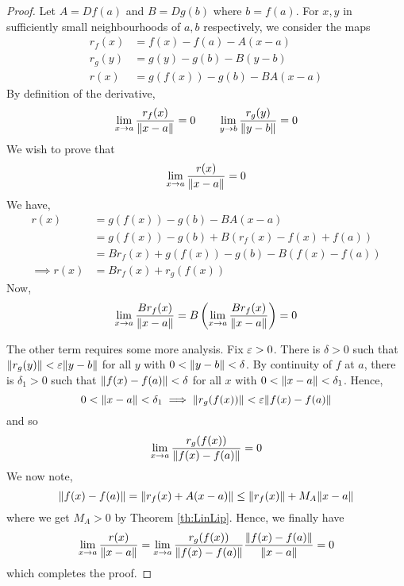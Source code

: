 \documentclass[../Analysis-3.tex]{subfiles}
\begin{document}
\begin{proof}
  Let $ A = Df(a) $ and $ B = Dg(b) $ where $ b = f(a) $. For $ x,y $ in sufficiently small neighbourhoods of $ a,b $ respectively, we consider the maps
  \begin{align*}
    r_f(x) & = f(x) - f(a) - A(x-a)      \\
    r_g(y) & = g(y) - g(b) - B(y-b)      \\
    r(x)   & = g(f(x)) - g(b) - BA(x-a)
  \end{align*}
  By definition of the derivative,
  \[ \lim_{x \to a}\frac{r_f(x)}{\norm{x-a}}=0 \qquad \lim_{y \to b}\frac{r_g(y)}{\norm{y-b}}=0\]
  We wish to prove that
  \[ \lim_{x \to a}\frac{r(x)}{\norm{x-a}}=0 \]
  We have,
  \begin{align*}
    r(x)          & = g(f(x)) - g(b) - BA(x-a)                \\
                  & = g(f(x)) - g(b) + B(r_f(x) - f(x)+f(a))  \\
                  & = Br_f(x) + g(f(x)) - g(b) - B(f(x)-f(a)) \\
    \implies r(x) & = Br_f(x) + r_g(f(x))
  \end{align*}
  Now,
  \[ \lim_{x \to a}\frac{Br_f(x)}{\norm{x-a}} = B \left(\lim_{x \to a}\frac{Br_f(x)}{\norm{x-a}}\right) = 0 \]\ssk
  
  The other term requires some more analysis. Fix $ \varepsilon > 0 $. There is $ \delta > 0 $ such that $ \norm{r_g(y)} < \varepsilon \norm{y-b} $ for all $ y $ with $ 0 < \norm{y-b} < \delta $. By continuity of $ f $ at $ a $, there is $ \delta_1 > 0 $ such that $ \norm{f(x) - f(a)} < \delta $ for all $ x $ with $ 0 < \norm{x-a} < \delta_1 $. Hence,
  \[ 0 < \norm{x-a} < \delta_1 \implies \norm{r_g(f(x))} < \varepsilon\norm{f(x)-f(a)} \]
  and so
  \[ \lim_{x \to a}\frac{r_g(f(x))}{\norm{f(x)-f(a)}} = 0 \]
  We now note,
  \[ \norm{f(x)-f(a)} = \norm{r_f(x)+A(x-a)} \leq \norm{r_f(x)} + M_A\norm{x-a} \]
  where we get $ M_A > 0 $ by Theorem \ref{th:LinLip}. Hence, we finally have
  \[ \lim_{x \to a}\frac{r(x)}{\norm{x-a}} = \lim_{x \to a}\frac{r_g(f(x))}{\norm{f(x)-f(a)}} \frac{\norm{f(x)-f(a)}}{\norm{x-a}} = 0 \]
  which completes the proof.
  
\end{proof}
\end{document}
